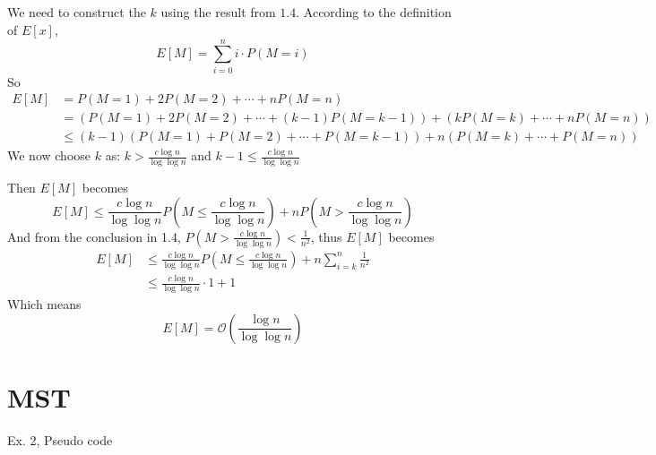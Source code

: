 \documentclass[A4paper]{article}
\begin{document}
\subsection{}
We need to construct the $k$ using the result from $1.4$.
According to the definition of $E[x]$, \[
	E[M] = \sum_{i=0}^n i\cdot P(M=i)
\]
So 
\[
	\begin{aligned}
	E[M] &= P(M=1) + 2P(M=2) + \cdots + nP(M=n) \\
	&= \left(P(M=1) + 2P(M=2) + \cdots + (k-1)P(M=k-1)\right)+ (kP(M=k)+ \cdots + nP(M=n)) \\
	& \leq (k-1) (P(M=1) + P(M=2) + \cdots + P(M=k-1)) + n(P(M=k)+ \cdots + P(M=n)) 
	\end{aligned}
\]
We now choose $k$ as: $\displaystyle k > \frac{c \log{n}}{\log{\log{n}}}$ and $\displaystyle k-1 \leq \frac{c \log{n}}{\log{\log{n}}}$ 
\par Then $E[M]$ becomes
\[
	E[M] \leq \frac{c \log{n}}{\log{\log{n}}} P(M \leq \frac{c \log{n}}{\log{\log{n}}}) + n P(M>\frac{c \log{n}}{\log{\log{n}}})
\]
And from the conclusion in 1.4, $\displaystyle P(M>\frac{c \log{n}}{\log{\log{n}}}) < \frac{1}{n^2}$, thus $E[M]$ becomes
\[
	\begin{aligned}
	E[M] &\leq \frac{c \log{n}}{\log{\log{n}}} P(M \leq \frac{c \log{n}}{\log{\log{n}}}) + n \sum_{i=k}^n \frac{1}{n^2} \\
	& \leq \frac{c \log{n}}{\log{\log{n}}}\cdot 1+ 1
	\end{aligned}
\]
Which means \[
	E[M] = \mathcal{O}(\frac{\log{n}}{\log{\log{n}}})
\]

\section{MST}
\begin{algorithm}[H]
\BlankLine
{}
\BlankLine
{}
\BlankLine
{}
\BlankLine
{}
\caption{Ex. 2, Pseudo code}
\end{algorithm}
\newpage
\end{document}
